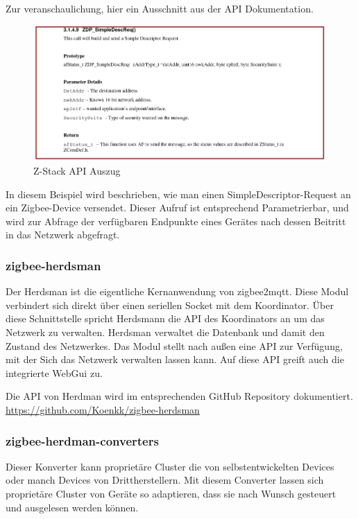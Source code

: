 Zur veranschaulichung, hier ein Ausschnitt aus der API Dokumentation.

\begin{figure}[H]
  \centering
  \includegraphics[width=1\textwidth]{media/z-stack-api-excerpt.png}
  \caption{Z-Stack API Auszug}
\end{figure}

In diesem Beispiel wird beschrieben, wie man einen SimpleDescriptor-Request an ein Zigbee-Device versendet. Dieser Aufruf ist entsprechend Parametrierbar,
und wird zur Abfrage der verfügbaren Endpunkte eines Gerätes nach dessen Beitritt in das Netzwerk abgefragt.

\subsubsection{zigbee-herdsman}

Der Herdsman ist die eigentliche Kernanwendung von zigbee2mqtt. Diese Modul verbindert sich direkt über einen seriellen Socket mit dem Koordinator. Über diese Schnittstelle
spricht Herdsmann die API des Koordinators an um das Netzwerk zu verwalten. Herdsman verwaltet die Datenbank und damit den Zustand des Netzwerkes. Das Modul stellt nach außen
eine API zur Verfügung, mit der Sich das Netzwerk verwalten lassen kann. Auf diese API greift auch die integrierte WebGui zu.

Die API von Herdman wird im entsprechenden GitHub Repository dokumentiert.
\url{https://github.com/Koenkk/zigbee-herdsman}

\subsubsection{zigbee-herdman-converters}

Dieser Konverter kann proprietäre Cluster die von selbstentwickelten Devices oder manch Devices von Drittherstellern. Mit diesem Converter lassen sich proprietäre Cluster von Geräte
so adaptieren, dass sie nach Wunsch gesteuert und ausgelesen werden können.

